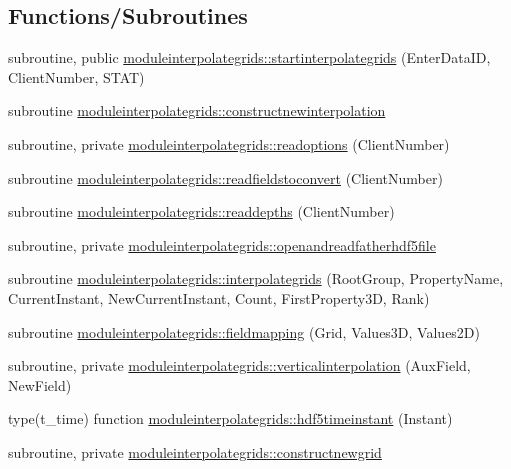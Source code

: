\subsection*{Functions/\+Subroutines}
\begin{DoxyCompactItemize}
\item 
subroutine, public \mbox{\hyperlink{namespacemoduleinterpolategrids_af563db97a33c679a4f2a61c77a82a50f}{moduleinterpolategrids\+::startinterpolategrids}} (Enter\+Data\+ID, Client\+Number, S\+T\+AT)
\item 
subroutine \mbox{\hyperlink{namespacemoduleinterpolategrids_ad2efee291ef78f4157e38ef104255bc3}{moduleinterpolategrids\+::constructnewinterpolation}}
\item 
subroutine, private \mbox{\hyperlink{namespacemoduleinterpolategrids_a18ff5c4dd12a7c5ee25d5ceaf91fd501}{moduleinterpolategrids\+::readoptions}} (Client\+Number)
\item 
subroutine \mbox{\hyperlink{namespacemoduleinterpolategrids_a1125f9b09e9502ada7dcfc306f876aac}{moduleinterpolategrids\+::readfieldstoconvert}} (Client\+Number)
\item 
subroutine \mbox{\hyperlink{namespacemoduleinterpolategrids_a4e19db7f9940572fb986010ea9d64ec3}{moduleinterpolategrids\+::readdepths}} (Client\+Number)
\item 
subroutine, private \mbox{\hyperlink{namespacemoduleinterpolategrids_ae103d8313a774b19abd42423e41be969}{moduleinterpolategrids\+::openandreadfatherhdf5file}}
\item 
subroutine \mbox{\hyperlink{namespacemoduleinterpolategrids_a138eb9151410639c12869a99628fc486}{moduleinterpolategrids\+::interpolategrids}} (Root\+Group, Property\+Name, Current\+Instant, New\+Current\+Instant, Count, First\+Property3D, Rank)
\item 
subroutine \mbox{\hyperlink{namespacemoduleinterpolategrids_aedd9412531395a797c1d8d210aeacfff}{moduleinterpolategrids\+::fieldmapping}} (Grid, Values3D, Values2D)
\item 
subroutine, private \mbox{\hyperlink{namespacemoduleinterpolategrids_ad4787724d5952f571795f2c775d76d32}{moduleinterpolategrids\+::verticalinterpolation}} (Aux\+Field, New\+Field)
\item 
type(t\+\_\+time) function \mbox{\hyperlink{namespacemoduleinterpolategrids_aa5a71ded8a9f342c24142a855b130d48}{moduleinterpolategrids\+::hdf5timeinstant}} (Instant)
\item 
subroutine, private \mbox{\hyperlink{namespacemoduleinterpolategrids_a569cf42cfeb7e7bc12b2bab66c56a0b1}{moduleinterpolategrids\+::constructnewgrid}}

\end{DoxyCompactItemize}
